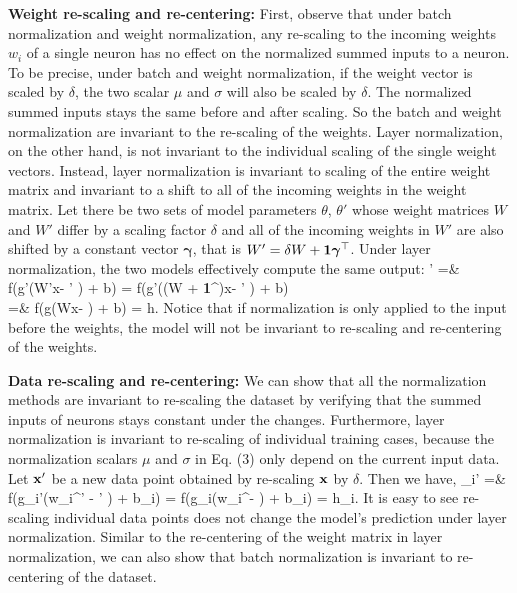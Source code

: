 \documentclass{article}
\newcommand{\T}{\top}
\def\bea#1\eea{\begin{align}#1\end{align}}
\newcommand{\gain}{{g}}
\newcommand{\Gain}{{\bold g}}
\newcommand{\bias}{{b}}
\newcommand{\Bias}{{\bold b}}
\newcommand{\weights}{{w}}
\newcommand{\hidden}{{h}}
\newcommand{\Hidden}{{\bold h}}
\newcommand{\data}{{\bold x}}
\begin{document}
{\textbf{Weight re-scaling and re-centering:}} First, observe that under batch normalization and weight normalization, any re-scaling to the incoming weights $\weights_i$ of a single neuron has no effect on the normalized summed inputs to a neuron.  To be precise, under batch and weight normalization, if the weight vector is scaled by $\delta$, the two scalar $\mu$ and $\sigma$ will also be scaled by $\delta$. The normalized summed inputs stays the same before and after scaling. So the batch and weight normalization are invariant to the re-scaling of the weights. Layer normalization, on the other hand,  is not invariant to the individual scaling of the single weight vectors. Instead, layer normalization is invariant to scaling of the entire weight matrix and invariant to a shift to all of the incoming weights in the weight matrix. Let there be two sets of model parameters $\theta$, $\theta'$ whose weight matrices $W$ and $W'$ differ by a scaling factor $\delta$ and all of the incoming weights in $W'$ are also shifted by a constant vector $\bm\gamma$, that is $W' = \delta W + {\bf 1}{\bm{\gamma}}^\T$. Under layer normalization, the two models effectively compute the same output:  
\bea
\Hidden' =& f({\Gain\over\sigma'}\left(W'\data - \mu' \right) + \Bias) = f({\Gain\over\sigma'}\left((\delta W + {\bf 1}{\bm{\gamma}}^\T)\data - \mu' \right) + \Bias) \nonumber \\
=& f({\Gain\over\sigma}\left(W\data - \mu \right) + \Bias) = \Hidden.
\eea
Notice that if normalization is only applied to the input before the weights, the model will not be invariant to re-scaling and re-centering of the weights.

{\textbf{Data re-scaling and re-centering:}} We can show that all the normalization methods are invariant to re-scaling the dataset by verifying that the summed inputs of neurons stays constant under the changes. Furthermore, layer normalization is invariant to re-scaling of individual training cases, because the normalization scalars $\mu$ and $\sigma$ in Eq. (3) only depend on the current input data. Let $\data'$ be a new data point obtained by re-scaling $\data$ by $\delta$. Then we have,   
\bea
\hidden_i' =& f({\gain_i\over\sigma'}\left(w_i^\T\data' - \mu' \right) + \bias_i)  
= f({\gain_i\over{\delta\sigma}}\left(\delta w_i^\T\data - \delta\mu \right) + \bias_i) = \hidden_i.
\eea
It is easy to see re-scaling individual data points does not change the model's prediction under layer normalization. Similar to the re-centering of the weight matrix in layer normalization, we can also show that batch normalization is invariant to re-centering of the dataset.
\end{document}
